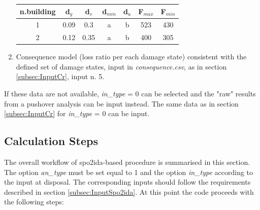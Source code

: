 \begin{enumerate}
\begin{table}[H]
\centering
\begin{tabular}{|c|c|c|c|c|c|c|} \hline
\textbf{n.building} & \textbf{d$_y$} & \textbf{d$_s$} & \textbf{d$_{min}$} & \textbf{d$_u$} & \textbf{F$_{max}$} & \textbf{F$_{min}$} \\ \hline
1 & 0.09	& 0.3	& a & b & 523 & 430\\ \hline
2 & 0.12	& 0.35	 & a & b & 400 & 305\\ \hline	
\end{tabular}
\end{table}

\item Consequence model (loss ratio per each damage state) consistent with the defined set of damage states, input in \textit{consequence.csv}, as in section \ref{subsec:InputCr}, input n. 5.
	
\end{enumerate}

If these data are not available, \textit{in\_type} = 0 can be selected and the "raw" results from a pushover analysis can be input instead. The same data as in section \ref{subsec:InputCr} for \textit{in\_type} = 0 can be input.

\subsection{Calculation Steps}
The overall workflow of spo2ida-based procedure is summarised in this section. The option \textit{an\_type} must be set equal to 1 and the option \textit{in\_type} according to the input at disposal. The corresponding inputs should follow the requirements described in section \ref{subsec:InputSpo2ida}. At this point the code proceeds with the following steps:

